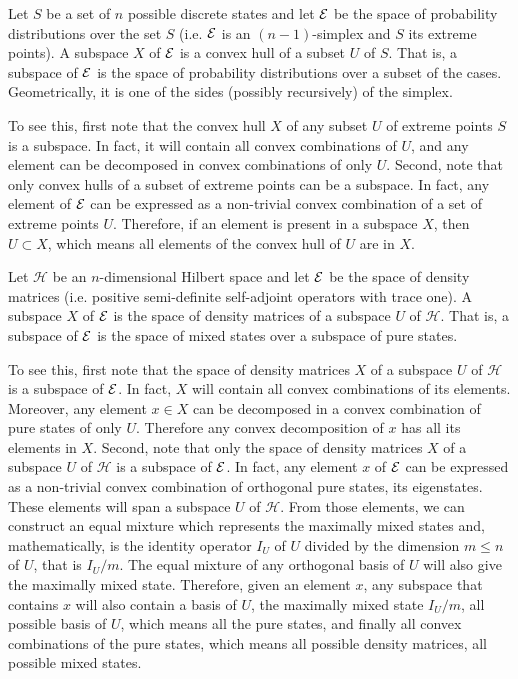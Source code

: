 \begin{example}
	Let $S$ be a set of $n$ possible discrete states and let $\mathcal{E}$ be the space of probability distributions over the set $S$ (i.e. $\mathcal{E}$ is an $(n-1)$-simplex and $S$ its extreme points). A subspace $X$ of $\mathcal{E}$ is a convex hull of a subset $U$ of $S$. That is, a subspace of $\mathcal{E}$ is the space of probability distributions over a subset of the cases. Geometrically, it is one of the sides (possibly recursively) of the simplex.
	
	To see this, first note that the convex hull $X$ of any subset $U$ of extreme points $S$ is a subspace. In fact, it will contain all convex combinations of $U$, and any element can be decomposed in convex combinations of only $U$. Second, note that only convex hulls of a subset of extreme points can be a subspace. In fact, any element of $\mathcal{E}$ can be expressed as a non-trivial convex combination of a set of extreme points $U$. Therefore, if an element is present in a subspace $X$, then $U \subset X$, which means all elements of the convex hull of $U$ are in $X$.
\end{example}

\begin{example}
	Let $\mathcal{H}$ be an $n$-dimensional Hilbert space and let $\mathcal{E}$ be the space of density matrices (i.e. positive semi-definite self-adjoint operators with trace one). A subspace $X$ of $\mathcal{E}$ is the space of density matrices of a subspace $U$ of $\mathcal{H}$. That is, a subspace of $\mathcal{E}$ is the space of mixed states over a subspace of pure states.
	
	To see this, first note that the space of density matrices $X$ of a subspace $U$ of $\mathcal{H}$ is a subspace of $\mathcal{E}$. In fact, $X$ will contain all convex combinations of its elements. Moreover, any element $x \in X$ can be decomposed in a convex combination of pure states of only $U$. Therefore any convex decomposition of $x$ has all its elements in $X$. Second, note that only the space of density matrices $X$ of a subspace $U$ of $\mathcal{H}$ is a subspace of $\mathcal{E}$. In fact, any element $x$ of $\mathcal{E}$ can be expressed as a non-trivial convex combination of orthogonal pure states, its eigenstates. These elements will span a subspace $U$ of $\mathcal{H}$. From those elements, we can construct an equal mixture which represents the maximally mixed states and, mathematically, is the identity operator $I_U$ of $U$ divided by the dimension $m \leq n$ of $U$, that is $I_U/m$. The equal mixture of any orthogonal basis of $U$ will also give the maximally mixed state. Therefore, given an element $x$, any subspace that contains $x$ will also contain a basis of $U$, the maximally mixed state $I_U/m$, all possible basis of $U$, which means all the pure states, and finally all convex combinations of the pure states, which means all possible density matrices, all possible mixed states.
\end{example}

